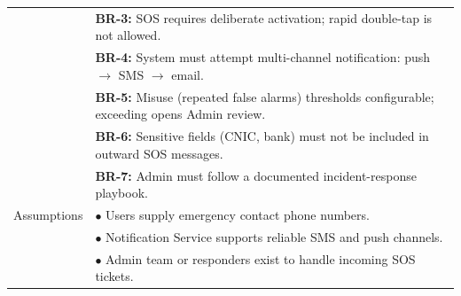 \begin{longtable}{|>{\raggedright\arraybackslash}p{4cm}|>{\raggedright\arraybackslash}p{11cm}|}
& \textbf{BR-3:} SOS requires deliberate activation; rapid double-tap is not allowed. \\
& \textbf{BR-4:} System must attempt multi-channel notification: push $\rightarrow$ SMS $\rightarrow$ email. \\
& \textbf{BR-5:} Misuse (repeated false alarms) thresholds configurable; exceeding opens Admin review. \\
& \textbf{BR-6:} Sensitive fields (CNIC, bank) must not be included in outward SOS messages. \\
& \textbf{BR-7:} Admin must follow a documented incident-response playbook. \\
\hline
Assumptions & $\bullet$ Users supply emergency contact phone numbers. \\
& $\bullet$ Notification Service supports reliable SMS and push channels. \\
& $\bullet$ Admin team or responders exist to handle incoming SOS tickets. \\
\hline


\end{longtable}
